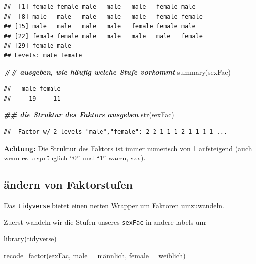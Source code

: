 \documentclass[
]{book}
\newenvironment{Shaded}{\begin{snugshade}}{\end{snugshade}}
\newcommand{\AttributeTok}[1]{\textcolor[rgb]{0.77,0.63,0.00}{#1}}
\newcommand{\DocumentationTok}[1]{\textcolor[rgb]{0.56,0.35,0.01}{\textbf{\textit{#1}}}}
\newcommand{\FunctionTok}[1]{\textcolor[rgb]{0.00,0.00,0.00}{#1}}
\newcommand{\NormalTok}[1]{#1}
\newcommand{\StringTok}[1]{\textcolor[rgb]{0.31,0.60,0.02}{#1}}
\begin{document}
\begin{verbatim}
##  [1] female female male   male   male   female male  
##  [8] male   male   male   male   male   female female
## [15] male   male   male   male   female female male  
## [22] female female male   male   male   male   female
## [29] female male  
## Levels: male female
\end{verbatim}

\begin{Shaded}
\begin{Highlighting}[]
\DocumentationTok{\#\# ausgeben, wie häufig welche Stufe vorkommt}
\FunctionTok{summary}\NormalTok{(sexFac)}
\end{Highlighting}
\end{Shaded}

\begin{verbatim}
##   male female 
##     19     11
\end{verbatim}

\begin{Shaded}
\begin{Highlighting}[]
\DocumentationTok{\#\# die Struktur des Faktors ausgeben}
\FunctionTok{str}\NormalTok{(sexFac)  }
\end{Highlighting}
\end{Shaded}

\begin{verbatim}
##  Factor w/ 2 levels "male","female": 2 2 1 1 1 2 1 1 1 1 ...
\end{verbatim}

\textbf{Achtung:} Die Struktur des Faktors ist immer numerisch von 1 aufsteigend (auch wenn es ursprünglich ``0'' und ``1'' waren, s.o.).

\hypertarget{uxe4ndern-von-faktorstufen}{%
\subsection{ändern von Faktorstufen}\label{uxe4ndern-von-faktorstufen}}

Das \texttt{tidyverse} bietet einen netten Wrapper um Faktoren umzuwandeln.

Zuerst wandeln wir die Stufen unseres \texttt{sexFac} in andere labels um:

\begin{Shaded}
\begin{Highlighting}[]
\FunctionTok{library}\NormalTok{(tidyverse)}

\FunctionTok{recode\_factor}\NormalTok{(sexFac,}
              \AttributeTok{male =} \StringTok{\textquotesingle{}männlich\textquotesingle{}}\NormalTok{,}
              \AttributeTok{female =} \StringTok{\textquotesingle{}weiblich\textquotesingle{}}\NormalTok{)}
\end{Highlighting}
\end{Shaded}
\end{document}
